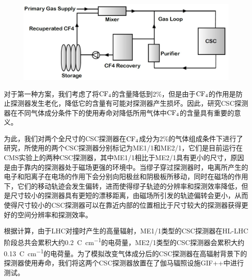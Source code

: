 \begin{figure}[!htbp]
    \centering
    \includegraphics[width=1.0\textwidth]{figures/chapter05/CSC_CF4_recuperation.png}
    \label{fig:c05f10}
\end{figure}

对于第一种方案，我们考虑了将$\mathrm{CF_4}$的含量降低到2\%，但是由于$\mathrm{CF_4}$的作用是防止探测器发生老化，降低它的含量有可能对探测器产生损坏。因此，研究CSC探测器在不同气体成分条件下的使用寿命对降低所用气体中$\mathrm{CF_4}$的含量具有重要的意义。

为此，我们对两个全尺寸的CSC探测器在$\mathrm{CF_4}$成分为2\%的气体组成条件下进行了研究，所使用的两个CSC探测器分别标记为ME1/1和ME2/1，它们是目前运行在CMS实验上的两种CSC探测器，其中ME1/1相比于ME2/1具有更小的尺寸，原因是由于靠内的探测器处于磁场更强的环境中。当缪子穿过探测器时，电离所产生的电子和阳离子在电场的作用下会分别向阳极丝和阴极板所移动，同时在磁场的作用下，它们的移动轨迹会发生偏转，进而使得缪子轨迹的分辨率和探测效率降低，但是尺寸较小的探测器具有更短的漂移距离，由磁场所引发的轨迹偏转会更小，从而使得尺寸较小的CSC探测器可以在靠近内部的位置相比于尺寸较大的探测器获得更好的空间分辨率和探测效率。

根据计算，由于LHC对撞时产生的高量辐射，ME1/1类型的CSC探测器在HL-LHC阶段总共会累积大约0.2~\si{{\coulomb\per\cm}}的电荷量，ME2/1类型的CSC探测器会累积大约0.13~\si{{\coulomb\per\cm}}的电荷量。为了模拟改变气体成分后的CSC探测器在高辐射背景下的探测器使用寿命，我们将这两个CSC探测器放置在了伽马辐照设施GIF++中进行测试。

